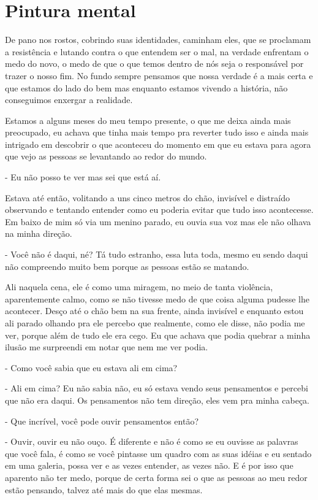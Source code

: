 \chapter{Pintura mental}
De pano nos rostos, cobrindo suas identidades, caminham eles, que se proclamam a resistência e lutando contra o que entendem ser o mal, na verdade enfrentam o medo do novo, o medo de que o que temos dentro de nós seja o responsável por trazer o nosso fim. No fundo sempre pensamos que nossa verdade é a mais certa e que estamos do lado do bem mas enquanto estamos vivendo a história, não conseguimos enxergar a realidade.

Estamos a alguns meses do meu tempo presente, o que me deixa ainda mais preocupado, eu achava que tinha mais tempo pra reverter tudo isso e ainda mais intrigado em descobrir o que aconteceu do momento em que eu estava para agora que vejo as pessoas se levantando ao redor do mundo.

- Eu não posso te ver mas sei que está aí.

Estava até então, volitando a uns cinco metros do chão, invisível e distraído observando e tentando entender como eu poderia evitar que tudo isso acontecesse. Em baixo de mim só via um menino parado, eu ouvia sua voz mas ele não olhava na minha direção.

- Você não é daqui, né? Tá tudo estranho, essa luta toda, mesmo eu sendo daqui não compreendo muito bem porque as pessoas estão se matando.

Ali naquela cena, ele é como uma miragem, no meio de tanta violência, aparentemente calmo, como se não tivesse medo de que coisa alguma pudesse lhe acontecer. Desço até o chão bem na sua frente, ainda invisível e enquanto estou ali parado olhando pra ele percebo que realmente, como ele disse, não podia me ver, porque além de tudo ele era cego. Eu que achava que podia quebrar a minha ilusão me surpreendi em notar que nem me ver podia.

- Como você sabia que eu estava ali em cima?

- Ali em cima? Eu não sabia não, eu só estava vendo seus pensamentos e percebi que não era daqui. Os pensamentos não tem direção, eles vem pra minha cabeça.

- Que incrível, você pode ouvir pensamentos então?

- Ouvir, ouvir eu não ouço. É diferente e não é como se eu ouvisse as palavras que você fala, é como se você pintasse um quadro com as suas idéias e eu sentado em uma galeria, possa ver e as vezes entender, as vezes não. E é por isso que aparento não ter medo, porque de certa forma sei o que as pessoas ao meu redor estão pensando, talvez até mais do que elas mesmas.

